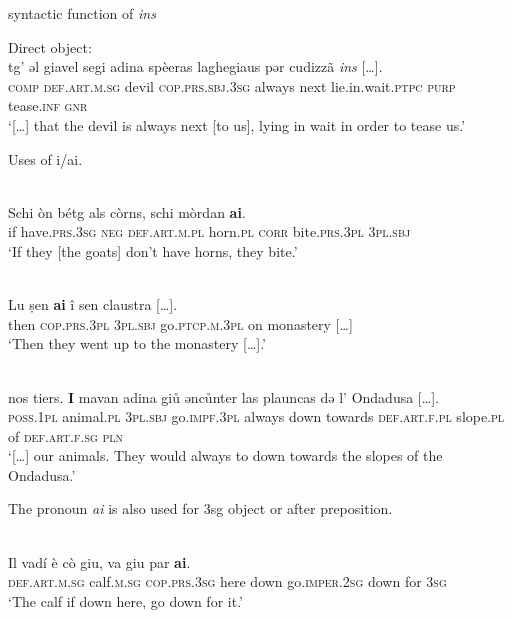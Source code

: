 {syntactic function of \textit{ins}

Direct object:
\ea\label{}
\\
\gll  […] tg’ ǝl giavel segi adina spèeras laghegiaus pǝr cudizzã \textit{ins} […].\\ %
     [...]  \textsc{comp} \textsc{def.art.m.sg} devil \textsc{cop.prs.sbj.3sg} always next lie.in.wait.\textsc{ptpc} \textsc{purp} tease.\textsc{inf} \textsc{gnr}\\
\glt `[…] that the devil is always next [to us], lying in wait in order to tease us.'
\z

Uses of i/ai.

\ea\label{}
\\
\gll  Schi òn bétg als còrns, schi mòrdan \textbf{ai}.  \\
     if have.\textsc{prs.3sg} \textsc{neg} \textsc{def.art.m.pl} horn.\textsc{pl} \textsc{corr} bite.\textsc{prs.3pl} \textsc{3pl.sbj}\\
\glt `If they [the goats] don’t have horns, they bite.'
\z


\ea\label{}
\\
\gll Lu ṣen \textbf{ai} î sen claustra […].\\
     then \textsc{cop.prs.3pl} \textsc{3pl.sbj}  go.\textsc{ptcp.m.3pl} on monastery […]\\
\glt `Then they went up to the monastery […].'
\z

\ea\label{}
\\
\gll  […] nos tiers. \textbf{I} mavan adina giů ǝncůnter las  plauncas  dǝ l’ Ondadusa […].\\
     […] \textsc{poss.1pl} animal.\textsc{pl} \textsc{3pl.sbj} go.\textsc{impf.3pl} always down towards \textsc{def.art.f.pl} slope.\textsc{pl} of \textsc{def.art.f.sg} \textsc{pln}\\
\glt `[…] our animals. They would always to down towards the slopes of the Ondadusa.'
\z

The pronoun \textit{ai} is also used for 3sg object or after preposition.

\ea\label{}
\\
\gll Il vadí è cò giu, va giu par \textbf{ai}.\\
\textsc{def.art.m.sg} calf.\textsc{m.sg} \textsc{cop.prs.3sg} here down go.\textsc{imper.2sg} down for \textsc{3sg}\\
\glt `The calf if down here, go down for it.'
\z


}
